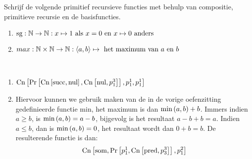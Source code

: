 \documentclass[a4paper]{article}
\newcommand{\prnul}[0]{\ensuremath{\mbox{nul}}}
\newcommand{\prsucc}[0]{\ensuremath{\mbox{succ}}}
\newcommand{\prp}[2]{\ensuremath{p_{#2}^{#1}}}
\newcommand{\prcn}[2]{\funmf{Cn}{#1,#2}}
\newcommand{\prpr}[2]{\funmf{Pr}{#1,#2}}
\begin{document}
\begin{question}
Schrijf de volgende primitief recursieve functies met behulp van compositie, primitieve recursie en de basisfuncties.
\begin{enumerate}
  \item $\mbox{sg}:\mathbb{N}\to\mathbb{N}:x\mapsto1\text{ als $x = 0$ en $x \mapsto 0$ anders}$
  \item $max:\mathbb{N} \times \mathbb{N}\to\mathbb{N}:\left\langle a,b \right\rangle\mapsto\text{ het maximum van $a$ en $b$}$
\end{enumerate}
\begin{answer}~~
\begin{enumerate}
 \item $\prcn{\prpr{\prcn{\prsucc}{\prnul}}{\prcn{\prnul}{\prp31}}}{\prp11,\prp11}$
 \item Hiervoor kunnen we gebruik maken van de in de vorige oefenzitting gedefinieerde functie $\mbox{min}$, het maximum is dan $\mbox{min}\left( a,b \right)+b$. Immers indien $a\geq b$, is $\mbox{min}\left( a,b \right)=a-b$, bijgevolg is het resultaat $a-b+b=a$. Indien $a\leq b$, dan is $\mbox{min}\left( a,b \right)=0$, het resultaat wordt dan $0+b=b$. De resulterende functie is dan:
 \begin{equation}
  \prcn{\mbox{som}}{\prpr{\prp{1}{1}}{\prcn{\mbox{pred}}{\prp{3}{3}}},\prp21}
 \end{equation}
\end{enumerate}
\end{answer}
\end{question}
\end{document}

